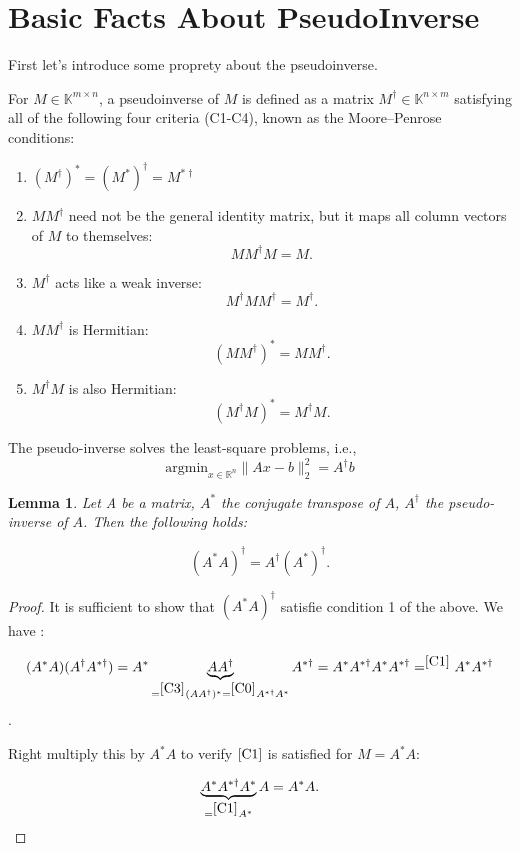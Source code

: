\documentclass{article}
\newtheorem{lemma}{Lemma}
\newcommand{\pinv}[1]{#1^{\dagger}}
\begin{document}
\section{Basic Facts About PseudoInverse}
First let's introduce some proprety about the pseudoinverse.

For $M \in \mathbb{K}^{m \times n}$, a pseudoinverse of $M$ is defined as a matrix $M^\dagger \in \mathbb{K}^{n \times m}$ satisfying all of the following four criteria (C1-C4), known as the Moore–Penrose conditions:

\begin{enumerate}[label=c\arabic*),ref=c\arabic*, start=0]
    \item \label{C0} $(\pinv{M})^* = \pinv{(M^*)} = M^{* \dagger}$
    \item \label{C1} \(M\pinv{M}\) need not be the general identity matrix, but it maps all column vectors of \(M\) to themselves:
    \[M\pinv{M}M = M.\]
    
    \item \label{C2} \(\pinv{M}\) acts like a weak inverse:
    \[\pinv{M}M\pinv{M} = \pinv{M}.\]
    
    \item \label{C3} \(M\pinv{M}\) is Hermitian:
    \[(M\pinv{M})^{*} = M\pinv{M}.\]
    
    \item \label{C4} \(\pinv{M}M\) is also Hermitian:
    \[(\pinv{M}M)^{*} = \pinv{M}M.\]
\end{enumerate}
The pseudo-inverse solves the least-square problems, i.e., 
$$
\text{argmin}_{x \in \mathbb{R}^n} \| Ax - b \|_2^2 =A^\dagger b
$$

\begin{lemma}
\label{l1}
Let A be a matrix, $A^*$ the conjugate transpose of $A$, $A^\dagger$ the pseudo-inverse of $A$. Then the following holds:

$$
(A^* A)^\dagger = A^\dagger (A^*)^\dagger.
$$
\end{lemma}

\begin{proof}
It is sufficient to show that $(A^* A)^\dagger$ satisfie condition 1 of the above. We have :

$$
(A^* A) (A^\dagger A^{* \dagger} ) = A^* \underbrace{A A^{\dagger}}_{=^{\ref{C3}}(AA^{\dagger})^* =^{\ref{C0}} A^{* \dagger} A^* } A^{* \dagger}  = A^* A^{* \dagger} A^* A^{* \dagger}  = ^{\ref{C1}} A^* {A^{* \dagger}}
$$.


Right multiply this by $A^* A$ to verify $\ref{C1}$ is satisfied for $M=A^* A$:

$$
 \underbrace{A^* A^{* \dagger} A^*}_{=^{\ref{C1}} A^*} A = A^* A. 
$$
\end{proof}
\end{document}

